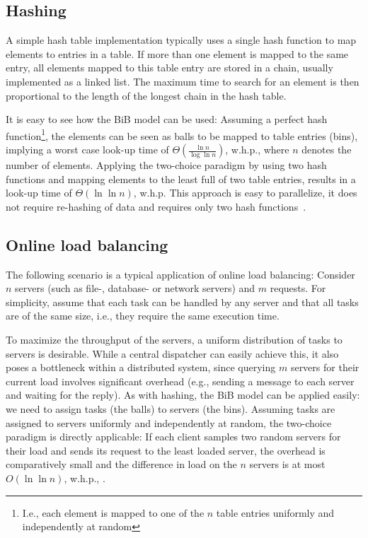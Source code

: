 \documentclass[a4paper,12pt]{article}
\begin{document}
\subsection{Hashing}
\label{sec:hashing}
A simple hash table implementation typically uses a single hash function to map elements to entries in a table. If more than one element is mapped to the same entry, all elements mapped to this table entry are stored in a chain, usually implemented as a linked list. The maximum time to search for an element is then proportional to the length of the longest chain in the hash table. 

It is easy to see how the BiB model can be used: Assuming a perfect hash function\footnote{I.e., each element is mapped to one of the $n$ table entries uniformly and independently at random}, the elements can be seen as balls to be mapped to table entries (bins), implying a worst case look-up time of $\Theta\left(\frac{\ln n}{\log \ln n}\right)$, w.h.p., where $n$ denotes the number of elements. Applying the two-choice paradigm by using two hash functions and mapping elements to the least full of two table entries, results in a look-up time of $\Theta\left(\ln \ln n\right)$, w.h.p. This approach is easy to parallelize, it does not require re-hashing of data and requires only two hash functions~\cite{ABKU99, MRS01}.

\subsection{Online load balancing}
\label{sec:loadbalancing}
The following scenario is a typical application of online load balancing: Consider $n$ servers (such as file-, database- or network servers) and $m$ requests. For simplicity, assume that each task can be handled by any server and that all tasks are of the same size, i.e., they require the same execution time.

To maximize the throughput of the servers, a uniform distribution of tasks to servers is desirable. While a central dispatcher can easily achieve this, it also poses a bottleneck within a distributed system, since querying $m$ servers for their current load involves significant overhead (e.g., sending a message to each server and waiting for the reply). As with hashing, the BiB model can be applied easily: we need to assign tasks (the balls) to servers (the bins). Assuming tasks are assigned to servers uniformly and independently at random, the two-choice paradigm is directly applicable: If each client samples two random servers for their load and sends its request to the least loaded server, the overhead is comparatively small and the difference in load on the $n$ servers is at most $O\left(\ln \ln n\right)$, w.h.p., \cite{KLM92,RS98, MRS01}.  
\end{document}
